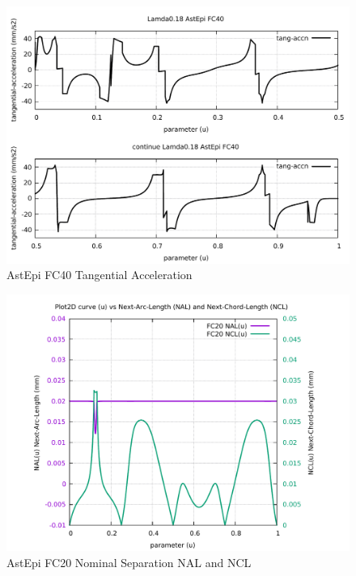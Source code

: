 \begin{figure}
	\caption     {AstEpi FC40 Tangential Acceleration}
	\label{24-img-AstEpi-FC40-Tangential-Acceleration.pdf}
\includegraphics[width=1.00\textwidth]{Chap4/appendix/app-AstEpi/plots/24-img-AstEpi-FC40-Tangential-Acceleration.pdf}
\end{figure}

\clearpage
\pagebreak

\begin{figure}
	\caption     {AstEpi FC20 Nominal Separation NAL and NCL}
	\label{25-img-AstEpi-FC20-Nominal-Separation-NAL-and-NCL.pdf}
\includegraphics[width=1.00\textwidth]{Chap4/appendix/app-AstEpi/plots/25-img-AstEpi-FC20-Nominal-Separation-NAL-and-NCL.pdf}
\end{figure}


